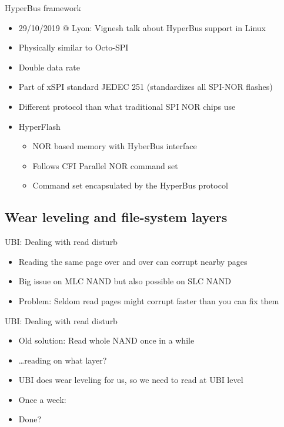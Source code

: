 \documentclass[aspectratio=169,obeyspaces,spaces,hyphens,dvipsnames]{beamer}
\begin{document}
\begin{frame}{HyperBus framework}
  \begin{itemize}
  \item 29/10/2019 @ Lyon: Vignesh talk about HyperBus support in Linux
    \vfill
  \item Physically similar to Octo-SPI
  \item Double data rate
  \item Part of xSPI standard JEDEC 251 (standardizes all SPI-NOR
    flashes)
  \item Different protocol than what traditional SPI NOR chips use
    \vfill
  \item HyperFlash
    \begin{itemize}
    \item NOR based memory with HyberBus interface
    \item Follows CFI Parallel NOR command set\\
    \item Command set encapsulated by the HyperBus protocol
    \end{itemize}
  \end{itemize}
\end{frame}

\subsection{Wear leveling and file-system layers}

\begin{frame}{UBI: Dealing with read disturb}
  \begin{itemize}
     \item Reading the same page over and over can corrupt nearby pages
     \item Big issue on MLC NAND but also possible on SLC NAND
     \item Problem: Seldom read pages might corrupt faster than you can fix them
   \end{itemize}
\end{frame}

\begin{frame}{UBI: Dealing with read disturb}
  \begin{itemize}
     \item Old solution: Read whole NAND once in a while
     \item \ldots reading on what layer?
     \item UBI does wear leveling for us, so we need to read at UBI level
     \item Once a week: 
     \item Done?
   \end{itemize}
\end{frame}
\end{document}
